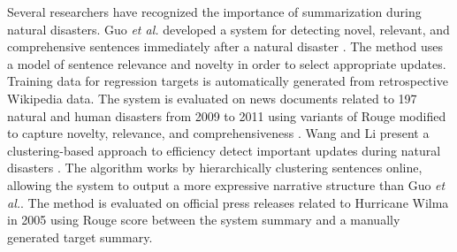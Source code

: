 Several researchers have recognized the importance of summarization during
natural disasters.  Guo \textit{et al.} developed a system for detecting
novel, relevant, and comprehensive sentences immediately after a natural
disaster \cite{qi:temporal-summarization}.  The method uses a model of
sentence relevance and novelty in order to select appropriate updates.
Training data for regression targets is automatically generated from
retrospective Wikipedia data.  The system is evaluated on news documents
related to 197 natural and human disasters from 2009 to 2011 using variants of
Rouge modified to capture novelty, relevance, and comprehensiveness
\cite{lin2004rouge}.  Wang and Li present a clustering-based approach to
efficiency detect important updates during natural disasters
\cite{wang:update-summarization}.  The algorithm works by hierarchically
clustering sentences online, allowing the system to output a more expressive
narrative structure than Guo \textit{et al.}.  The method is evaluated on
official press releases related to Hurricane Wilma  in 2005 using Rouge score
between the system summary and a manually generated target summary.
